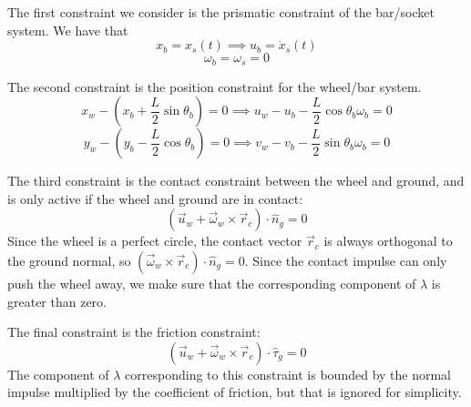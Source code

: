 \documentclass[9pt]{article}
\begin{document}
The first constraint we consider is the prismatic constraint of the bar/socket system. We have that 
\[
x_b = x_s(t) \implies u_b = \dot{x}_s(t)
\]
\[
\omega_b = \omega_s = 0
\]

The second constraint is the position constraint for the wheel/bar system. 
\[
x_w - \left(x_b + \frac{L}{2}\sin \theta_b\right) = 0 \implies u_w - u_b - \frac{L}{2}\cos \theta_b \omega_b = 0
\]
\[
y_w - \left(y_b - \frac{L}{2}\cos \theta_b\right) = 0 \implies v_w - v_b - \frac{L}{2}\sin \theta_b \omega_b = 0
\]

The third constraint is the contact constraint between the wheel and ground, and is only active if the wheel and ground are in contact:
\[
(\vec{u}_w + \vec{\omega}_w \times \vec{r}_c) \cdot \hat{n}_g = 0
\]
Since the wheel is a perfect circle, the contact vector $\vec{r}_c$ is always orthogonal to the ground normal, so $(\vec{\omega}_w \times \vec{r}_c) \cdot \hat{n}_g = 0$. Since the contact impulse can only push the wheel away, we make sure that the corresponding component of $\lambda$ is greater than zero.

The final constraint is the friction constraint: 
\[
(\vec{u}_w + \vec{\omega}_w \times \vec{r}_c) \cdot \hat{\tau}_g = 0
\]
The component of $\lambda$ corresponding to this constraint is bounded by the normal impulse multiplied by the coefficient of friction, but that is ignored for simplicity.
\end{document}
